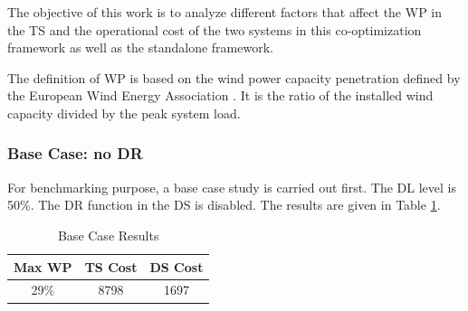 
The objective of this work is to analyze different factors that affect the WP in the TS and the operational cost of the two systems in this co-optimization framework as well as the standalone framework.

The definition of WP is based on the wind power capacity penetration defined by the European Wind Energy Association \cite{european2012wind}. It is the ratio of the installed wind capacity divided by the peak system load.


\subsubsection{Base Case: no DR}
For benchmarking purpose, a base case study is carried out first. The DL level is 50\%. The DR function in the DS is disabled. The results are given in Table \ref{transbus}.


\begin{table}[H]
\centering
\begin{tabular}{ |c|c|c| } 
 \hline
 Max WP & TS Cost & DS Cost \\ 
 \hline
29\% & 8798 & 1697 \\ 
 \hline
\end{tabular}
\caption{ Base Case Results}
 \label{transbus}
\end{table}

